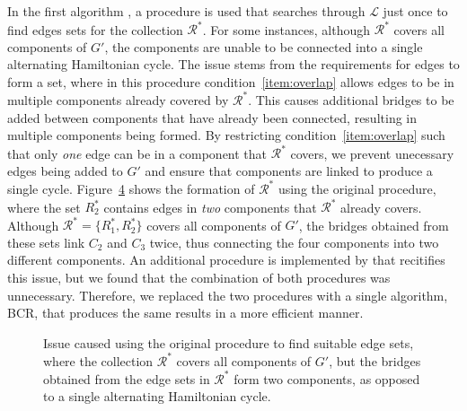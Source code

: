 \documentclass[authoryear]{elsarticle}
\begin{document}
\noindent In the first algorithm \citep{becker2010}, a procedure is used that searches through $\mathcal{L}$ just once to find edges sets for the collection $\mathcal{R}^*$. For some instances, although $\mathcal{R}^*$ covers all components of $G'$, the components are unable to be connected into a single alternating Hamiltonian cycle. The issue stems from the requirements for edges to form a set, where in this procedure condition~\ref{item:overlap} allows edges to be in multiple components already covered by $\mathcal{R}^*$. This causes additional bridges to be added between components that have already been connected, resulting in multiple components being formed. By restricting condition~\ref{item:overlap} such that only \emph{one} edge can be in a component that $\mathcal{R}^*$ covers, we prevent unecessary edges being added to $G'$ and ensure that components are linked to produce a single cycle. Figure~\ref{fig:overlaperror} shows the formation of $\mathcal{R}^*$ using the original procedure, where the set $R^*_2$ contains edges in \emph{two} components that $\mathcal{R}^*$ already covers. Although $\mathcal{R}^* = \{R^*_1, R^*_2\}$ covers all components of $G'$, the bridges obtained from these sets link $C_2$ and $C_3$ twice, thus connecting the four components into two different components. An additional procedure is implemented by \citet{hawa2018} that recitifies this issue, but we found that the combination of both procedures was unnecessary. Therefore, we replaced the two procedures with a single algorithm, BCR, that produces the same results in a more efficient manner. 

\begin{figure}[H]
	\centering	
	\begin{subfigure}[h]{0.35\textwidth}
		
		\caption{}
		\label{fig:bcrerror}
	\end{subfigure} \hspace{5mm}
	\begin{subfigure}[h]{0.25\textwidth}
		
		\caption{}
		\label{fig:mpsconnecterror}
	\end{subfigure} \hspace{5mm}
	\begin{subfigure}[h]{0.25\textwidth}
		
		\caption{}
		\label{fig:mpscycleerror}
	\end{subfigure}
	\caption{Issue caused using the original procedure to find suitable edge sets, where the collection $\mathcal{R}^*$ covers all components of $G'$, but the bridges obtained from the edge sets in $\mathcal{R}^*$ form two components, as opposed to a single alternating Hamiltonian cycle.}	
	\label{fig:overlaperror}
\end{figure}
\end{document}
